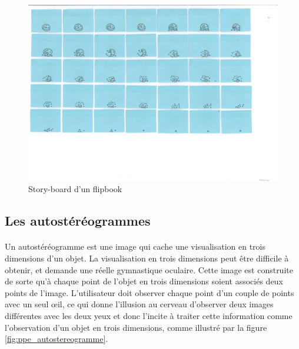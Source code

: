 \begin{figure}[h!]
		\centering
		\includegraphics[]{flipbook.png}
		\caption{\label{fig:flipbook} Story-board d’un flipbook \protect \footnotemark }
\end{figure}

\subsection{Les autostéréogrammes}	

\paragraph{}
Un autostéréogramme est une image qui cache une visualisation en trois dimensions d’un objet. La visualisation en trois dimensions peut être difficile à obtenir, et demande une réelle gymnastique oculaire. Cette image est construite de sorte qu'à chaque point de l'objet en trois dimensions soient associés deux points de l'image. L'utilisateur doit observer chaque point d'un couple de points avec un seul œil, ce qui donne l'illusion au cerveau d'observer deux images différentes avec les deux yeux et donc l'incite à traiter cette information comme l'observation d'un objet en trois dimensions, comme illustré par la figure \ref{fig:ppe_autostereogramme}.

